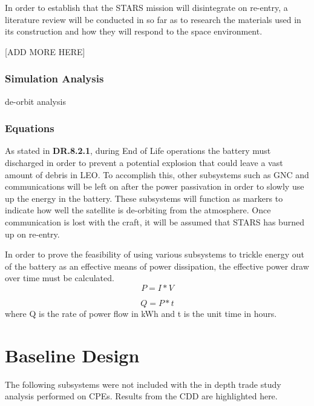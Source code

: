In order to establish that the STARS mission will disintegrate on re-entry, a literature review will be conducted in so far as to research the materials used in its construction and how they will respond to the space environment. 

[ADD MORE HERE]

\subsubsection{Simulation Analysis}
de-orbit analysis
\subsubsection{Equations}
As stated in \textbf{DR.8.2.1}, during End of Life operations the battery must discharged in order to prevent a potential explosion that could leave a vast amount of debris in LEO. To accomplish this, other subsystems such as GNC and communications will be left on after the power passivation in order to slowly use up the energy in the battery. These subsystems will function as markers to indicate how well the satellite is de-orbiting from the atmosphere. Once communication is lost with the craft, it will be assumed that STARS has burned up on re-entry.

In order to prove the feasibility of using various subsystems to trickle energy out of the battery as an effective means of power dissipation, the effective power draw over time must be calculated. 
\begin{equation}
    P = I * V
\end{equation}

\begin{equation}
    Q = P * t
\end{equation}
where Q is the rate of power flow in kWh and t is the unit time in hours.
\section{Baseline Design}

The following subsystems were not included with the in depth trade study analysis performed on CPEs.  Results from the CDD are highlighted here.
\bigskip

